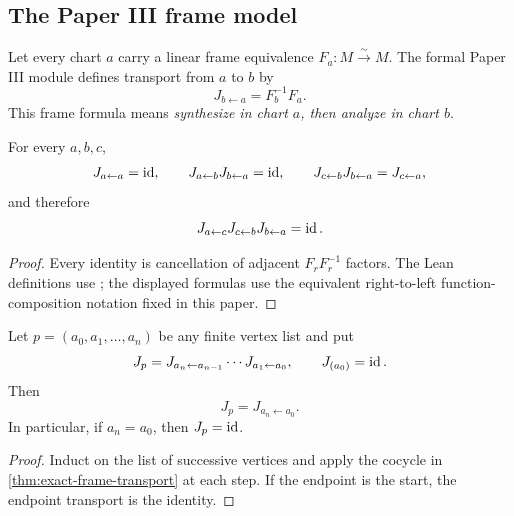 \subsection{The Paper III frame model}

Let every chart $a$ carry a linear frame equivalence
$F_a:M\xrightarrow{\sim}M$.  The formal Paper III module defines transport
from $a$ to $b$ by
\[
J_{b\leftarrow a}=F_b^{-1}F_a.
\]
This frame formula means \emph{synthesize in chart \(a\), then
analyze in chart \(b\)}.

\begin{theorem}
\label{thm:exact-frame-transport}
For every $a,b,c$,
\[
J_{a\leftarrow a}=\operatorname{id},\qquad
J_{a\leftarrow b}J_{b\leftarrow a}=\operatorname{id},\qquad
J_{c\leftarrow b}J_{b\leftarrow a}=J_{c\leftarrow a},
\]
and therefore
\[
J_{a\leftarrow c}J_{c\leftarrow b}J_{b\leftarrow a}=\operatorname{id}.
\]
\end{theorem}

\begin{proof}
Every identity is cancellation of adjacent $F_rF_r^{-1}$ factors.  The Lean
definitions use ; the displayed formulas use the
equivalent right-to-left function-composition notation fixed in this paper.
\end{proof}

\begin{theorem}
\label{thm:exact-path-transport}
Let $p=(a_0,a_1,\ldots,a_n)$ be any finite vertex list and put
\[
J_p
=J_{a_n\leftarrow a_{n-1}}\cdots J_{a_1\leftarrow a_0},
\qquad
J_{(a_0)}=\operatorname{id}.
\]
Then
\[
J_p=J_{a_n\leftarrow a_0}.
\]
In particular, if $a_n=a_0$, then $J_p=\operatorname{id}$.
\end{theorem}

\begin{proof}
Induct on the list of successive vertices and apply the cocycle in
\cref{thm:exact-frame-transport} at each step.  If the endpoint is the start,
the endpoint transport is the identity.
\end{proof}

